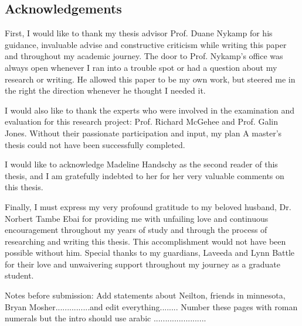 \thispagestyle{empty}

\begin{center}
    \Large
    
\section*{Acknowledgements}

\end{center}

\vspace{1cm}

First, I would like to thank my thesis advisor Prof.  Duane Nykamp for  his guidance, invaluable advise and constructive criticism while  writing this paper and throughout my academic journey. The door to Prof. Nykamp's office was always open whenever I ran into a trouble spot or had a question about my research or writing. He  allowed this paper to be my own work, but steered me in the right the direction whenever he thought I needed it.


I would also like to thank the experts who were involved in the examination and evaluation for this research project: Prof.
Richard McGehee and Prof. Galin Jones.  Without their passionate participation and input,  my plan A master's thesis could not have been successfully completed.


I would  like to acknowledge Madeline Handschy as the second reader of this thesis, and I am gratefully indebted to her for her very valuable comments on this thesis.


Finally, I must express my very profound gratitude to my beloved husband, Dr.  Norbert Tambe Ebai  for providing me with unfailing love and continuous encouragement throughout my years of study and through the process of researching and writing this thesis. This accomplishment would not have been possible without him.  Special thanks to my  guardians, Laveeda and Lynn Battle for their love and unwaivering  support throughout my journey as a graduate student.



Notes before submission: Add  statements  about Neilton, friends in minnesota, Bryan Mosher...............and edit everything........
Number these pages with roman numerals but the intro should use arabic .......................


\vfill




\newpage